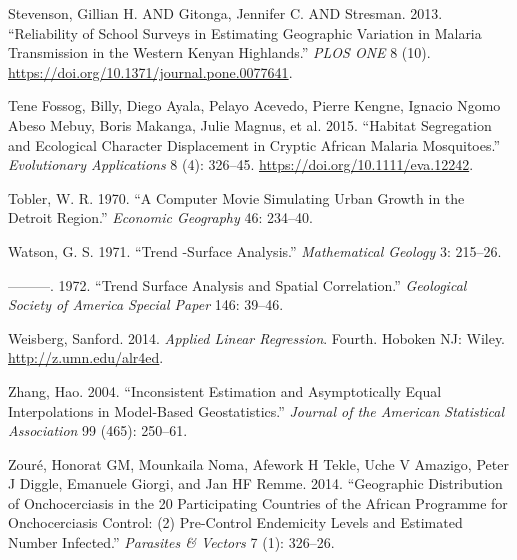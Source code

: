 \documentclass[
  letterpaper,
]{krantz}
\newlength{\cslhangindent}
\newlength{\cslentryspacingunit} %
\newenvironment{CSLReferences}[2] %
 {%
  \setlength{\parindent}{0pt}
  \ifodd #1
  \let\oldpar\par
  \def\par{\hangindent=\cslhangindent\oldpar}
  \fi
  \setlength{\parskip}{#2\cslentryspacingunit}
 }%
 {}
\begin{document}
\begin{CSLReferences}{1}{0}
\leavevmode{}%
Stevenson, Gillian H. AND Gitonga, Jennifer C. AND Stresman. 2013.
{``Reliability of School Surveys in Estimating Geographic Variation in
Malaria Transmission in the Western Kenyan Highlands.''} \emph{PLOS ONE}
8 (10). \url{https://doi.org/10.1371/journal.pone.0077641}.

\leavevmode{}%
Tene Fossog, Billy, Diego Ayala, Pelayo Acevedo, Pierre Kengne, Ignacio
Ngomo Abeso Mebuy, Boris Makanga, Julie Magnus, et al. 2015. {``Habitat
Segregation and Ecological Character Displacement in Cryptic African
Malaria Mosquitoes.''} \emph{Evolutionary Applications} 8 (4): 326--45.
\url{https://doi.org/10.1111/eva.12242}.

\leavevmode{}%
Tobler, W. R. 1970. {``A Computer Movie Simulating Urban Growth in the
Detroit Region.''} \emph{Economic Geography} 46: 234--40.

\leavevmode{}%
Watson, G. S. 1971. {``Trend -Surface Analysis.''} \emph{Mathematical
Geology} 3: 215--26.

\leavevmode{}%
---------. 1972. {``Trend Surface Analysis and Spatial Correlation.''}
\emph{Geological Society of America Special Paper} 146: 39--46.

\leavevmode{}%
Weisberg, Sanford. 2014. \emph{Applied Linear Regression}. Fourth.
Hoboken {NJ}: Wiley. \url{http://z.umn.edu/alr4ed}.

\leavevmode{}%
Zhang, Hao. 2004. {``Inconsistent Estimation and Asymptotically Equal
Interpolations in Model-Based Geostatistics.''} \emph{Journal of the
American Statistical Association} 99 (465): 250--61.

\leavevmode{}%
Zouré, Honorat GM, Mounkaila Noma, Afework H Tekle, Uche V Amazigo,
Peter J Diggle, Emanuele Giorgi, and Jan HF Remme. 2014. {``Geographic
Distribution of Onchocerciasis in the 20 Participating Countries of the
African Programme for Onchocerciasis Control: (2) Pre-Control Endemicity
Levels and Estimated Number Infected.''} \emph{Parasites \& Vectors} 7
(1): 326--26.

\end{CSLReferences}
\end{document}
